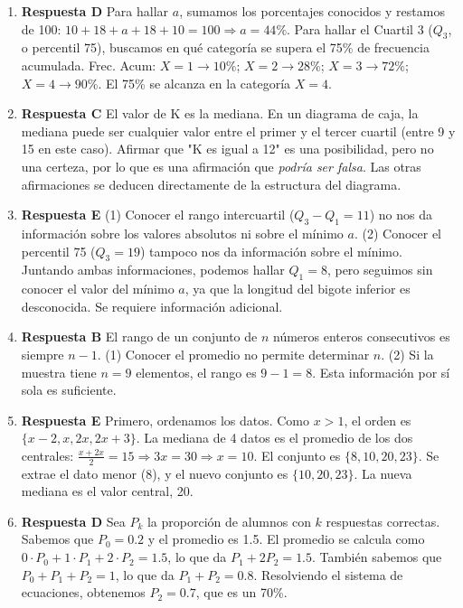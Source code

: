 \documentclass[11pt]{article}
\begin{document}
\begin{enumerate}
    \item \textbf{Respuesta D} Para hallar $a$, sumamos los porcentajes conocidos y restamos de 100: $10+18+a+18+10=100 \Rightarrow a=44\%$. Para hallar el Cuartil 3 ($Q_3$, o percentil 75), buscamos en qué categoría se supera el 75\% de frecuencia acumulada. Frec. Acum: $X=1 \to 10\%$; $X=2 \to 28\%$; $X=3 \to 72\%$; $X=4 \to 90\%$. El 75\% se alcanza en la categoría $X=4$. %
    
    \item \textbf{Respuesta C} El valor de K es la mediana. En un diagrama de caja, la mediana puede ser cualquier valor entre el primer y el tercer cuartil (entre 9 y 15 en este caso). Afirmar que "K es igual a 12" es una posibilidad, pero no una certeza, por lo que es una afirmación que \textit{podría ser falsa}. Las otras afirmaciones se deducen directamente de la estructura del diagrama. %

    \item \textbf{Respuesta E} (1) Conocer el rango intercuartil ($Q_3-Q_1=11$) no nos da información sobre los valores absolutos ni sobre el mínimo $a$. (2) Conocer el percentil 75 ($Q_3=19$) tampoco nos da información sobre el mínimo. Juntando ambas informaciones, podemos hallar $Q_1=8$, pero seguimos sin conocer el valor del mínimo $a$, ya que la longitud del bigote inferior es desconocida. Se requiere información adicional. %

    \item \textbf{Respuesta B} El rango de un conjunto de $n$ números enteros consecutivos es siempre $n-1$. (1) Conocer el promedio no permite determinar $n$. (2) Si la muestra tiene $n=9$ elementos, el rango es $9-1=8$. Esta información por sí sola es suficiente. %

    \item \textbf{Respuesta E} Primero, ordenamos los datos. Como $x>1$, el orden es $\{x-2, x, 2x, 2x+3\}$. La mediana de 4 datos es el promedio de los dos centrales: $\frac{x+2x}{2} = 15 \Rightarrow 3x=30 \Rightarrow x=10$. El conjunto es $\{8, 10, 20, 23\}$. Se extrae el dato menor (8), y el nuevo conjunto es $\{10, 20, 23\}$. La nueva mediana es el valor central, 20. %
    
    \item \textbf{Respuesta D} Sea $P_k$ la proporción de alumnos con $k$ respuestas correctas. Sabemos que $P_0=0.2$ y el promedio es 1.5. El promedio se calcula como $0 \cdot P_0 + 1 \cdot P_1 + 2 \cdot P_2 = 1.5$, lo que da $P_1+2P_2=1.5$. También sabemos que $P_0+P_1+P_2=1$, lo que da $P_1+P_2=0.8$. Resolviendo el sistema de ecuaciones, obtenemos $P_2=0.7$, que es un 70\%. %
    

\end{enumerate}
\end{document}
